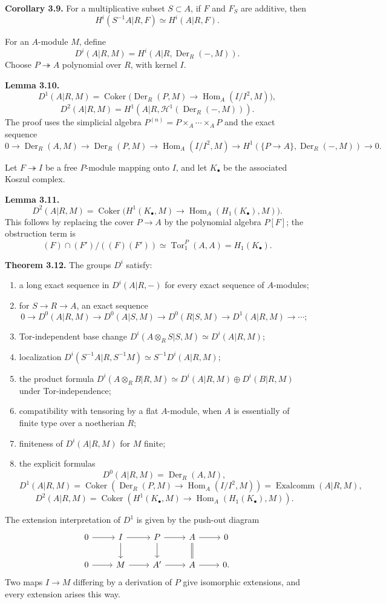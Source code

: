\documentclass[11pt]{article}
\providecommand{\Tor}{\operatorname{Tor}}
\providecommand{\Hom}{\operatorname{Hom}}
\providecommand{\Der}{\operatorname{Der}}
\providecommand{\Coker}{\operatorname{Coker}}
\providecommand{\Exalcomm}{\operatorname{Exalcomm}}
\providecommand{\cH}{\mathcal H}
\begin{document}
\textbf{Corollary 3.9.}  For a multiplicative subset \(S\subset A\), if \(F\) and \(F_S\) are additive, then
\[
H^i(S^{-1}A|R,F)\simeq H^i(A|R,F).
\]

For an \(A\)-module \(M\), define
\[
D^i(A|R,M)=H^i(A|R,\Der_R(-,M)).
\]
Choose \(P\twoheadrightarrow A\) polynomial over \(R\), with kernel \(I\).

\textbf{Lemma 3.10.}
\[
D^1(A|R,M)=\Coker\bigl(\Der_R(P,M)\to\Hom_A(I/I^2,M)\bigr),
\]
\[
D^2(A|R,M)=H^1(A|R,\cH^1(\Der_R(-,M))).
\]
The proof uses the simplicial algebra \(P^{(n)}=P\times_A\cdots\times_AP\) and the exact sequence
\[
0\to\Der_R(A,M)\to\Der_R(P,M)\to\Hom_A(I/I^2,M)\to H^1(\{P\to A\},\Der_R(-,M))\to0.
\]

Let \(F\twoheadrightarrow I\) be a free \(P\)-module mapping onto \(I\), and let \(K_\bullet\) be the associated Koszul complex.

\textbf{Lemma 3.11.}
\[
D^2(A|R,M)=\Coker\bigl(H^1(K_\bullet,M)\to\Hom_A(H_1(K_\bullet),M)\bigr).
\]
This follows by replacing the cover \(P\to A\) by the polynomial algebra \(P[F]\); the obstruction term is
\[
(F)\cap(F')/((F)(F'))\simeq \Tor^P_1(A,A)=H_1(K_\bullet).
\]

\textbf{Theorem 3.12.}  The groups \(D^i\) satisfy:
\begin{enumerate}[label=\textup{(\arabic*)}]
\item a long exact sequence in \(D^i(A|R,-)\) for every exact sequence of \(A\)-modules;
\item for \(S\to R\to A\), an exact sequence
\[
0\to D^0(A|R,M)\to D^0(A|S,M)\to D^0(R|S,M)\to D^1(A|R,M)\to\cdots;
\]
\item Tor-independent base change \(D^i(A\otimes_RS|S,M)\simeq D^i(A|R,M)\);
\item localization \(D^i(S^{-1}A|R,S^{-1}M)\simeq S^{-1}D^i(A|R,M)\);
\item the product formula \(D^i(A\otimes_RB|R,M)\simeq D^i(A|R,M)\oplus D^i(B|R,M)\) under Tor-independence;
\item compatibility with tensoring by a flat \(A\)-module, when \(A\) is essentially of finite type over a noetherian \(R\);
\item finiteness of \(D^i(A|R,M)\) for \(M\) finite;
\item the explicit formulas
\[
D^0(A|R,M)=\Der_R(A,M),
\]
\[
D^1(A|R,M)=\Coker(\Der_R(P,M)\to\Hom_A(I/I^2,M))=\Exalcomm(A|R,M),
\]
\[
D^2(A|R,M)=\Coker(H^1(K_\bullet,M)\to\Hom_A(H_1(K_\bullet),M)).
\]
\end{enumerate}
The extension interpretation of \(D^1\) is given by the push-out diagram
\[
\begin{tikzcd}
0\arrow[r]&I\arrow[r]\arrow[d]&P\arrow[r]\arrow[d]&A\arrow[r]\arrow[d,equal]&0\\
0\arrow[r]&M\arrow[r]&A'\arrow[r]&A\arrow[r]&0.
\end{tikzcd}
\]
Two maps \(I\to M\) differing by a derivation of \(P\) give isomorphic extensions, and every extension arises this way.
\end{document}

